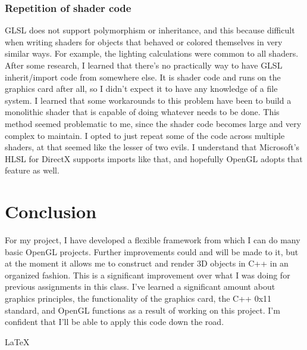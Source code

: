 \documentclass[journal]{IEEEtran}
\begin{document}
\subsubsection{Repetition of shader code}

GLSL does not support polymorphism or inheritance, and this because difficult when writing shaders for objects that behaved or colored themselves in very similar ways. For example, the lighting calculations were common to all shaders. After some research, I learned that there's no practically way to have GLSL inherit/import code from somewhere else. It is shader code and runs on the graphics card after all, so I didn't expect it to have any knowledge of a file system. I learned that some workarounds to this problem have been to build a monolithic shader that is capable of doing whatever needs to be done. This method seemed problematic to me, since the shader code becomes large and very complex to maintain. I opted to just repeat some of the code across multiple shaders, at that seemed like the lesser of two evils. I understand that Microsoft's HLSL for DirectX supports imports like that, and hopefully OpenGL adopts that feature as well.

\section{Conclusion}

For my project, I have developed a flexible framework from which I can do many basic OpenGL projects. Further improvements could and will be made to it, but at the moment it allows me to construct and render 3D objects in C++ in an organized fashion. This is a significant improvement over what I was doing for previous assignments in this class. I've learned a significant amount about graphics principles, the functionality of the graphics card, the C++ 0x11 standard, and OpenGL functions as a result of working on this project. I'm confident that I'll be able to apply this code down the road.

\LaTeX{}
\end{document}
